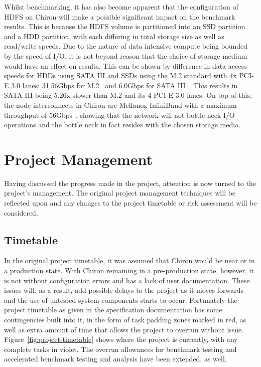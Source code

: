 \documentclass[12pt,a4paper]{article}
\begin{document}
            Whilst benchmarking, it has also become apparent that the configuration of HDFS on Chiron will make a possible significant impact on the benchmark results. This is because the HDFS volume is partitioned into an SSD partition and a HDD partition, with each differing in total storage size as well as read/write speeds. Due to the nature of data intensive compute being bounded by the speed of I/O, it is not beyond reason that the choice of storage medium would have an effect on results. This can be shown by difference in data access speeds for HDDs using SATA III and SSDs using the M.2 standard with 4x PCI-E 3.0 lanes: 31.56Gbps for M.2~\cite{understanding-pcie} and 6.0Gbps for SATA III~\cite{sata-3-standard}. This results in SATA III being 5.26x slower than M.2 and its 4 PCI-E 3.0 lanes. On top of this, the node interconnects in Chiron are Mellanox InfiniBand with a maximum throughput of 56Gbps~\cite{mellanox-infiniband-manual}, showing that the network will not bottle neck I/O operations and the bottle neck in fact resides with the chosen storage media.
    
    \section{Project Management}
    \label{sec:project_management}

        Having discussed the progress made in the project, attention is now turned to the project's management. The original project management techniques will be reflected upon and any changes to the project timetable or risk assessment will be considered.
    
        \subsection{Timetable}
        \label{sub:timetable}

            In the original project timetable, it was assumed that Chiron would be near or in a production state. With Chiron remaining in a pre-production state, however, it is not without configuration errors and has a lack of user documentation. These issues will, as a result, add possible delays to the project as it moves forwards and the use of untested system components starts to occur. Fortunately the project timetable as given in the specification documentation has some contingencies built into it, in the form of task padding zones marked in red, as well as extra amount of time that allows the project to overrun without issue. Figure~\ref{fig:project-timetable} shows where the project is currently, with any complete tasks in violet. The overrun allowances for benchmark testing and accelerated benchmark testing and analysis have been extended, as well.
\end{document}
